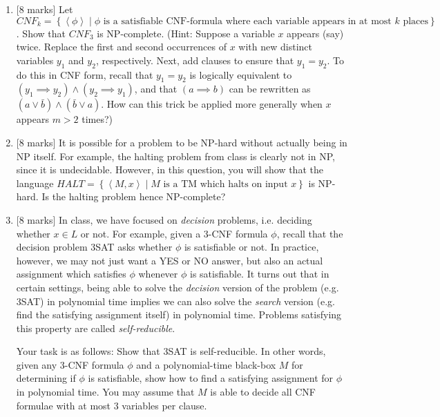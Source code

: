 \documentclass{article}
\newcommand{\set}[1]{{\left\{#1\right\}}}    %
\newcommand{\enc}[1]{\left<#1\right>}
\begin{document}
\begin{enumerate}
\begin{enumerate}

    \end{enumerate}
    \item {[8 marks]} Let $CNF_k=\set{\enc{\phi}\mid\phi\text{ is a satisfiable CNF-formula where each variable appears in at most }k\text{ places}}$. Show that ${CNF}_3$ is NP-complete. (Hint: Suppose a variable $x$ appears (say) twice. Replace the first and second occurrences of $x$ with new distinct variables $y_1$ and $y_2$, respectively. Next, add clauses to ensure that $y_1=y_2$. To do this in CNF form, recall that $y_1=y_2$ is logically equivalent to $(y_1\implies y_2)\wedge(y_2\implies y_1)$, and that $(a\implies b)$ can be rewritten as $(a\vee \bar{b})\wedge (\bar{b}\vee {a})$. How can this trick be applied more generally when $x$ appears $m>2$ times?)



    \item {[8 marks]} It is possible for a problem to be NP-hard without actually being in NP itself. For example, the halting problem from class is clearly not in NP, since it is undecidable. However, in this question, you will show that the language $HALT=\set{\enc{M,x}\mid M\text{ is a TM which halts on input }x}$ is NP-hard. Is the halting problem hence NP-complete?



    \item {[8 marks]} In class, we have focused on \emph{decision} problems, i.e. deciding whether $x\in L$ or not. For example, given a 3-CNF formula $\phi$, recall that the decision problem 3SAT asks whether $\phi$ is satisfiable or not. In practice, however, we may not just want a YES or NO answer, but also an actual assignment which satisfies $\phi$ whenever $\phi$ is satisfiable. It turns out that in certain settings, being able to solve the \emph{decision} version of the problem (e.g. 3SAT) in polynomial time implies we can also solve the \emph{search} version (e.g. find the satisfying assignment itself) in polynomial time. Problems satisfying this property are called \emph{self-reducible}.

Your task is as follows: Show that 3SAT is self-reducible. In other words, given any 3-CNF formula $\phi$ and a polynomial-time black-box $M$ for determining if $\phi$ is satisfiable, show how to find a satisfying assignment for $\phi$ in polynomial time. You may assume that $M$ is able to decide all CNF formulae with {at most} 3 variables per clause.


\end{enumerate}
\end{document}
